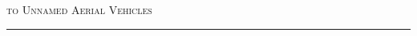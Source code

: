 \documentclass[preview]{standalone}
\begin{document}
\begin{center}
\scshape\Large to Unnamed Aerial Vehicles \hrule
\end{center}
\end{document}
